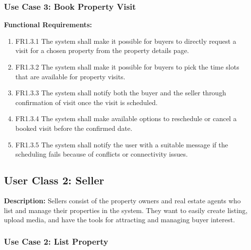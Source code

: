 \subsubsection{Use Case 3: Book Property Visit}

\textbf{Functional Requirements:}
\begin{enumerate}
    \item FR1.3.1 The system shall make it possible for buyers to directly request a visit for a chosen property from the property details page.
    \item FR1.3.2 The system shall make it possible for buyers to pick the time slots that are available for property visits.
    \item FR1.3.3 The system shall notify both the buyer and the seller through confirmation of visit once the visit is scheduled.
    \item FR1.3.4 The system shall make available options to reschedule or cancel a booked visit before the confirmed date.
    \item FR1.3.5 The system shall notify the user with a suitable message if the scheduling fails because of conflicts or connectivity issues.
\end{enumerate}

\subsection{User Class 2: Seller}

\textbf{Description:} Sellers consist of the property owners and real estate agents who list and manage their properties in the system. They want to easily create listing, upload media, and have the tools for attracting and managing buyer interest.

\subsubsection{Use Case 2: List Property}

